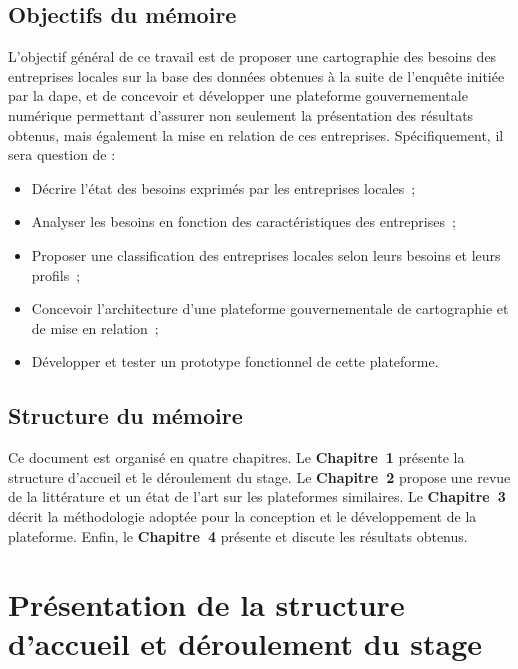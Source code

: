 \documentclass[12pt, a4paper, oneside]{report}
\begin{document}
\section*{Objectifs du mémoire}

L'objectif général de ce travail est de proposer une cartographie des besoins des entreprises locales sur la base des données obtenues à la suite de l'enquête initiée par la \gls{dape}, et de concevoir et développer une plateforme gouvernementale numérique permettant d'assurer non seulement la présentation des résultats obtenus, mais également la mise en relation de ces entreprises. Spécifiquement, il sera question de :

\begin{itemize}
  \item Décrire l'état des besoins exprimés par les entreprises locales~;
  \item Analyser les besoins en fonction des caractéristiques des entreprises~;
  \item Proposer une classification des entreprises locales selon leurs besoins et leurs profils~;
  \item Concevoir l'architecture d'une plateforme gouvernementale de cartographie et de mise en relation~;
  \item Développer et tester un prototype fonctionnel de cette plateforme.
\end{itemize}

\section*{Structure du mémoire}

Ce document est organisé en quatre chapitres. Le \textbf{Chapitre~1} présente la structure d'accueil et le déroulement du stage. Le \textbf{Chapitre~2} propose une revue de la littérature et un état de l'art sur les plateformes similaires. Le \textbf{Chapitre~3} décrit la méthodologie adoptée pour la conception et le développement de la plateforme. Enfin, le \textbf{Chapitre~4} présente et discute les résultats obtenus.

\chapter{Présentation de la structure d'accueil et déroulement du stage}
\label{chap:structure}
\end{document}
